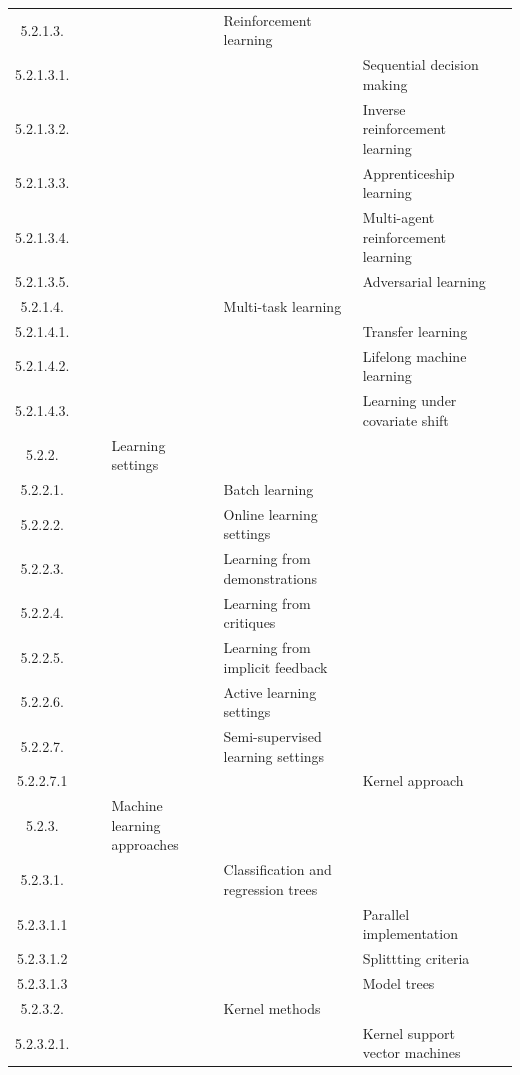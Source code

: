 \documentclass[12pt]{article}
\begin{document}
\begin{center}
{\begin{tabularx}{\linewidth}{|c|X|X|X|X|X|X|}
		5.2.1.3. &   &   &   &  Reinforcement learning &   &   \\
		5.2.1.3.1. &   &   &   &   &  Sequential decision making &   \\
		5.2.1.3.2. &   &   &   &   &  Inverse reinforcement learning &   \\
		5.2.1.3.3. &   &   &   &   &  Apprenticeship learning &   \\
		5.2.1.3.4. &   &   &   &   &  Multi-agent reinforcement learning &   \\
		5.2.1.3.5. &   &   &   &   &  Adversarial learning &   \\
		5.2.1.4. &   &   &   &  Multi-task learning &   &   \\
		5.2.1.4.1. &   &   &   &   &  Transfer learning &   \\
		5.2.1.4.2. &   &   &   &   &  Lifelong machine learning &   \\
		5.2.1.4.3. &   &   &   &   &  Learning under covariate shift &   \\
		5.2.2. &   &   &  Learning settings &   &   &   \\
		5.2.2.1. &   &   &   &  Batch learning &   &   \\
		5.2.2.2. &   &   &   &  Online learning settings &   &   \\
		5.2.2.3. &   &   &   &  Learning from demonstrations &   &   \\
		5.2.2.4. &   &   &   &  Learning from critiques &   &   \\
		5.2.2.5. &   &   &   &  Learning from implicit feedback &   &   \\
		5.2.2.6. &   &   &   &  Active learning settings &   &   \\
		5.2.2.7. &   &   &   &  Semi-supervised learning settings &   &   \\
		5.2.2.7.1 &   &   &   &   &  Kernel approach &   \\
		5.2.3. &   &   &  Machine learning approaches &   &   &   \\
		5.2.3.1. &   &   &   &  Classification and regression trees &   &   \\
		5.2.3.1.1 &   &   &   &   &  Parallel implementation &   \\
		5.2.3.1.2 &   &   &   &   &  Splittting criteria &   \\
		5.2.3.1.3 &   &   &   &   &  Model trees &   \\
		5.2.3.2. &   &   &   &  Kernel methods &   &   \\
		5.2.3.2.1. &   &   &   &   &  Kernel support vector machines &   \\

\end{tabularx}}
\end{center}
\end{document}
